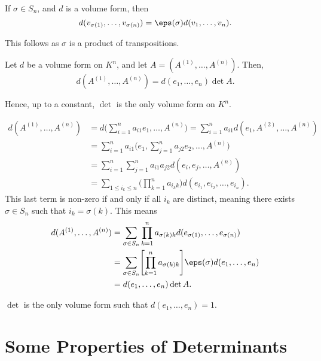 \documentclass[12pt]{article}
\begin{document}
\begin{corollary}
	If $\sigma \in S_n$, and $d$ is a volume form, then
	\[
		d(v_{\sigma(1)}, \ldots, v_{\sigma(n)}) = \eps(\sigma) d(v_1, \ldots, v_n)
	.\]
\end{corollary}

This follows as $\sigma$ is a product of transpositions.

\begin{theorem}
	Let $d$ be a volume form on $K^{n}$, and let $A = (A^{(1)}, \ldots, A^{(n)})$. Then,
	\[
		d(A^{(1)}, \ldots, A^{(n)}) = d(e_1, \ldots, e_n) \det A
	.\]
\end{theorem}

Hence, up to a constant, $\det$ is the only volume form on $K^{n}$.

\begin{proofbox}
	\begin{align*}
		d(A^{(1)}, \ldots, A^{(n)}) &= d \Biggl( \sum_{i = 1}^{n} a_{i1}e_1, \ldots, A^{(n)} \Biggr) = \sum_{i = 1}^{n} a_{i1} d(e_1, A^{(2)}, \ldots, A^{(n)}) \\
					    &= \sum_{i = 1}^{n} a_{i1} \Biggl( e_1, \sum_{j = 1}^{n} a_{j2}e_2, \ldots, A^{(n)}\Biggr) \\
					    &= \sum_{i = 1}^{n} \sum_{j = 1}^{n} a_{i1}a_{j2} d(e_i, e_j, \ldots, A^{(n)}) \\
					    &= \sum_{1 \leq i_k \leq n} \Biggl( \prod_{k = 1}^{n} a_{i_k k} \Biggr) d(e_{i_1}, e_{i_2}, \ldots, e_{i_n}).
	\end{align*}
	This last term is non-zero if and only if all $i_k$ are distinct, meaning there exists $\sigma \in S_n$ such that $i_k = \sigma(k)$. This means
	\begin{align*}
		d(A^{(1)}, \ldots, A^{(n)}) &= \sum_{\sigma \in S_n} \prod_{k = 1}^{n} a_{\sigma(k) k}d(e_{\sigma(1)}, \ldots, e_{\sigma(n)}) \\
					    &= \sum_{\sigma \in S_n} \Biggl[ \prod_{k = 1}^{n} a_{\sigma(k) k} \Biggr] \eps(\sigma) d(e_1, \ldots, e_n) \\
					    &= d(e_1, \ldots, e_n) \det A.
	\end{align*}
\end{proofbox}

\begin{corollary}
	$\det$ is the only volume form such that $d(e_1, \ldots, e_n) = 1$.
\end{corollary}

\newpage

\section{Some Properties of Determinants}%
\label{sec:some_properties_of_determinants}
\end{document}
